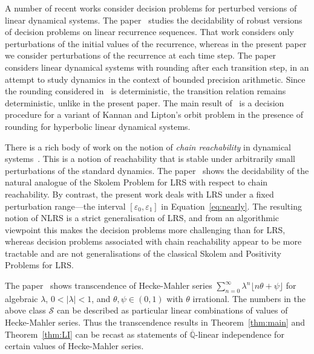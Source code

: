 \documentclass[a4paper,UKenglish,cleveref, autoref, thm-restate]{lipics-v2021}
\begin{document}
A number of recent works consider decision problems for perturbed
versions of linear dynamical systems.  The paper~\cite{AkshayBGV24}
studies the decidability of robust versions of decision problems on
linear recurrence sequences.  That work considers only perturbations
of the initial values of the recurrence, whereas in the present paper
we consider perturbations of the recurrence at each time step.  The
paper~\cite{rounding} considers linear dynamical systems with rounding
after each transition step, in an attempt to study dynamics in the
context of bounded precision arithmetic.  Since the rounding
considered in~\cite{rounding} is deterministic, the transition
relation remains deterministic, unlike in the present paper.  The main
result of~\cite{rounding} is a decision procedure for a variant of
Kannan and Lipton's orbit problem in the presence of rounding for
hyperbolic linear dynamical systems.

There is a rich body of work on the notion of \emph{chain
  reachability} in dynamical systems~\cite[Chapters 6 and
7]{katok1995modern}.  This is a notion of reachability that is stable
under arbitrarily small perturbations of the standard dynamics.  The
paper~\cite{DCostaKMOSS021} shows the decidability of the natural
analogue of the Skolem Problem for LRS with respect to chain
reachability.  By contrast, the present work deals with LRS under a
fixed perturbation range---the interval $[\varepsilon_0,\varepsilon_1]$ in
Equation~\eqref{eq:nearly}.  The resulting notion of NLRS is a strict
generalisation of LRS, and from an algorithmic viewpoint this makes
the decision problems more challenging than for LRS, whereas
decision problems associated with chain reachability appear to be more
tractable and are not generalisations of the classical Skolem and
Positivity Problems for LRS.



The paper~\cite{BL23} shows 
transcendence of Hecke-Mahler
series $\sum_{n=0}^\infty \lambda^n \lfloor n\theta + \psi \rfloor$ for algebraic $\lambda$, $0<|\lambda|<1$, and $\theta,\psi\in(0,1)$ with $\theta$ irrational.
The numbers in the above class $\mathcal S$ can be described as particular linear combinations of values of Hecke-Mahler series.  Thus the transcendence results in Theorem~\ref{thm:main}
and Theorem~\ref{thm:LI} can be recast as statements of $\overline{\mathbb Q}$-linear independence for certain values of Hecke-Mahler series.
\end{document}
